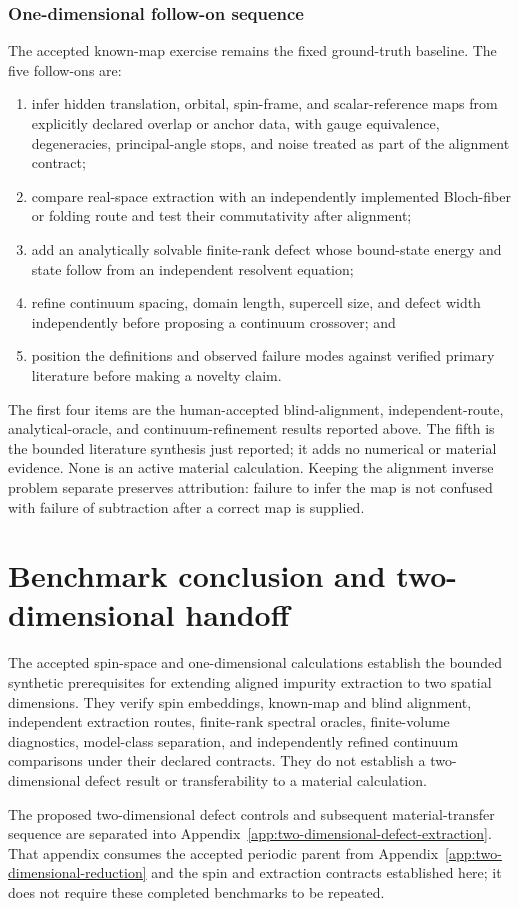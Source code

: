 \subsubsection{One-dimensional follow-on sequence}

The accepted known-map exercise remains the fixed ground-truth baseline. The
five follow-ons are:
\begin{enumerate}
    \item infer hidden translation, orbital, spin-frame, and scalar-reference
          maps from explicitly declared overlap or anchor data, with gauge
          equivalence, degeneracies, principal-angle stops, and noise treated as
          part of the alignment contract;
    \item compare real-space extraction with an independently implemented
          Bloch-fiber or folding route and test their commutativity after
          alignment;
    \item add an analytically solvable finite-rank defect whose bound-state
          energy and state follow from an independent resolvent equation;
    \item refine continuum spacing, domain length, supercell size, and defect
          width independently before proposing a continuum crossover; and
    \item position the definitions and observed failure modes against verified
          primary literature before making a novelty claim.
\end{enumerate}
The first four items are the human-accepted blind-alignment,
independent-route, analytical-oracle, and continuum-refinement results reported
above. The fifth is the bounded literature synthesis just reported; it adds no
numerical or material evidence. None is an active material calculation.
Keeping the alignment inverse problem separate preserves attribution: failure
to infer the map is not confused with failure of subtraction after a correct
map is supplied.

\section{Benchmark conclusion and two-dimensional handoff}

The accepted spin-space and one-dimensional calculations establish the bounded
synthetic prerequisites for extending aligned impurity extraction to two
spatial dimensions. They verify spin embeddings, known-map and blind
alignment, independent extraction routes, finite-rank spectral oracles,
finite-volume diagnostics, model-class separation, and independently refined
continuum comparisons under their declared contracts. They do not establish a
two-dimensional defect result or transferability to a material calculation.

The proposed two-dimensional defect controls and subsequent material-transfer
sequence are separated into
Appendix~\ref{app:two-dimensional-defect-extraction}. That appendix consumes
the accepted periodic parent from
Appendix~\ref{app:two-dimensional-reduction} and the spin and extraction
contracts established here; it does not require these completed benchmarks to
be repeated.
